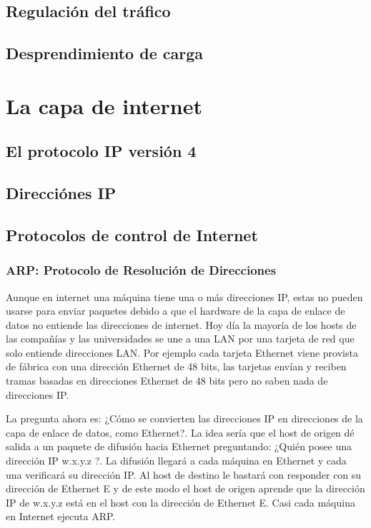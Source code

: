 \documentclass[10pt,a4paper]{report}
\begin{document}
\subsection{Regulación del tráfico}
\subsection{Desprendimiento de carga}

\section{La capa de internet}
	\subsection{El protocolo IP versión 4}
	\subsection{Direcciónes IP}


\subsection{Protocolos de control de Internet}


\subsubsection{ARP: Protocolo de Resolución de Direcciones}

	\par Aunque en internet una máquina tiene una o más direcciones IP, estas no pueden usarse para enviar paquetes debido a que el hardware de la capa de enlace de datos no entiende las direcciones de internet. Hoy día la mayoría de los hosts de las compañías y las universidades se une a una LAN por una tarjeta de red que solo entiende direcciones LAN. Por ejemplo cada tarjeta Ethernet viene provista de fábrica con una dirección Ethernet de 48 bits, las tarjetas envían y reciben tramas basadas en direcciones Ethernet de 48 bits pero no saben nada de direcciones IP.
	
	\par La pregunta ahora es: ¿Cómo se convierten las direcciones IP en direcciones de la capa de enlace de datos, como Ethernet?. La idea sería que el host de origen dé salida a un paquete de difusión hacia Ethernet preguntando: ¿Quién posee una dirección IP w.x.y.z ?. La difusión llegará a cada máquina en Ethernet y cada una verificará su dirección IP. Al host de destino le bastará con responder con su dirección de Ethernet E y de este modo el host de origen aprende que la dirección IP de w.x.y.z está en el host con la dirección de Ethernet E. Casi cada máquina en Internet ejecuta ARP.
\end{document}
